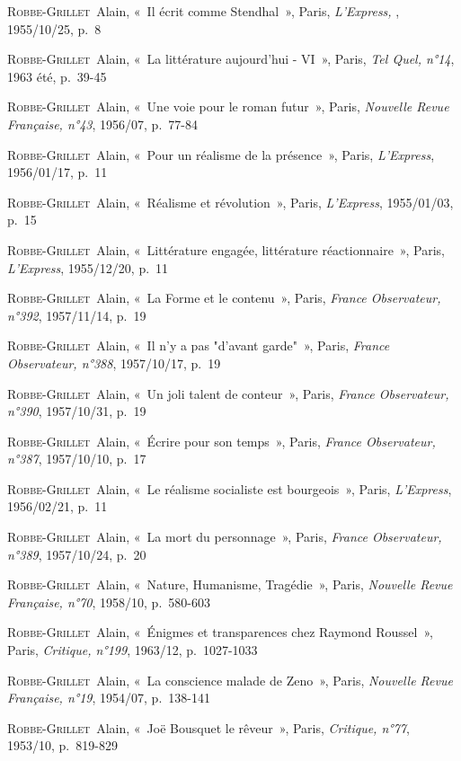 \documentclass[12pt, a4paper]{article}
\begin{document}
		
		\textsc{Robbe-Grillet}~Alain, «~Il écrit comme Stendhal~», Paris, \textit{L'Express, }, 1955/10/25, p.~8\par
	\textsc{Robbe-Grillet}~Alain, «~La littérature aujourd'hui - VI~», Paris, \textit{Tel Quel, n°14}, 1963 été, p.~39-45\par
	\textsc{Robbe-Grillet}~Alain, «~Une voie pour le roman futur~», Paris, \textit{Nouvelle Revue Française, n°43}, 1956/07, p.~77-84\par
	\textsc{Robbe-Grillet}~Alain, «~Pour un réalisme de la présence~», Paris, \textit{L'Express}, 1956/01/17, p.~11\par
	\textsc{Robbe-Grillet}~Alain, «~Réalisme et révolution~», Paris, \textit{L'Express}, 1955/01/03, p.~15\par
	\textsc{Robbe-Grillet}~Alain, «~Littérature engagée, littérature réactionnaire~», Paris, \textit{L'Express}, 1955/12/20, p.~11\par
	\textsc{Robbe-Grillet}~Alain, «~La Forme et le contenu~», Paris, \textit{France Observateur, n°392}, 1957/11/14, p.~19\par
	\textsc{Robbe-Grillet}~Alain, «~Il n'y a pas "d'avant garde"~», Paris, \textit{France Observateur, n°388}, 1957/10/17, p.~19\par
	\textsc{Robbe-Grillet}~Alain, «~Un joli talent de conteur~», Paris, \textit{France Observateur, n°390}, 1957/10/31, p.~19\par
	\textsc{Robbe-Grillet}~Alain, «~Écrire pour son temps~», Paris, \textit{France Observateur, n°387}, 1957/10/10, p.~17\par
	\textsc{Robbe-Grillet}~Alain, «~Le réalisme socialiste est bourgeois~», Paris, \textit{L'Express}, 1956/02/21, p.~11\par
	\textsc{Robbe-Grillet}~Alain, «~La mort du personnage~», Paris, \textit{France Observateur, n°389}, 1957/10/24, p.~20\par
	\textsc{Robbe-Grillet}~Alain, «~Nature, Humanisme, Tragédie~», Paris, \textit{Nouvelle Revue Française, n°70}, 1958/10, p.~580-603\par
	\textsc{Robbe-Grillet}~Alain, «~Énigmes et transparences chez Raymond Roussel~», Paris, \textit{Critique, n°199}, 1963/12, p.~1027-1033\par
	\textsc{Robbe-Grillet}~Alain, «~La conscience malade de Zeno~», Paris, \textit{Nouvelle Revue Française, n°19}, 1954/07, p.~138-141\par
	\textsc{Robbe-Grillet}~Alain, «~Joë Bousquet le rêveur~», Paris, \textit{Critique, n°77}, 1953/10, p.~819-829\par
\end{document}

